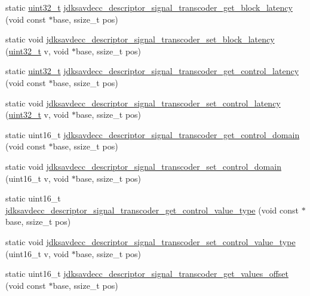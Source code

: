\begin{DoxyCompactItemize}
static \hyperlink{parse_8c_a6eb1e68cc391dd753bc8ce896dbb8315}{uint32\+\_\+t} \hyperlink{group__descriptor__transcoder_ga747b2b28da46e2c0f3bf92f45ff433cf}{jdksavdecc\+\_\+descriptor\+\_\+signal\+\_\+transcoder\+\_\+get\+\_\+block\+\_\+latency} (void const $\ast$base, ssize\+\_\+t pos)
\item 
static void \hyperlink{group__descriptor__transcoder_ga74c6c70c19aec0d001be07c4ea5e559f}{jdksavdecc\+\_\+descriptor\+\_\+signal\+\_\+transcoder\+\_\+set\+\_\+block\+\_\+latency} (\hyperlink{parse_8c_a6eb1e68cc391dd753bc8ce896dbb8315}{uint32\+\_\+t} v, void $\ast$base, ssize\+\_\+t pos)
\item 
static \hyperlink{parse_8c_a6eb1e68cc391dd753bc8ce896dbb8315}{uint32\+\_\+t} \hyperlink{group__descriptor__transcoder_gafbe51054f4b853727f902d0eb37499cf}{jdksavdecc\+\_\+descriptor\+\_\+signal\+\_\+transcoder\+\_\+get\+\_\+control\+\_\+latency} (void const $\ast$base, ssize\+\_\+t pos)
\item 
static void \hyperlink{group__descriptor__transcoder_gad57618363cabb19525d09165a26752bd}{jdksavdecc\+\_\+descriptor\+\_\+signal\+\_\+transcoder\+\_\+set\+\_\+control\+\_\+latency} (\hyperlink{parse_8c_a6eb1e68cc391dd753bc8ce896dbb8315}{uint32\+\_\+t} v, void $\ast$base, ssize\+\_\+t pos)
\item 
static uint16\+\_\+t \hyperlink{group__descriptor__transcoder_ga888814a14a73fbfafd1f19c3458607ea}{jdksavdecc\+\_\+descriptor\+\_\+signal\+\_\+transcoder\+\_\+get\+\_\+control\+\_\+domain} (void const $\ast$base, ssize\+\_\+t pos)
\item 
static void \hyperlink{group__descriptor__transcoder_gac6a523bb0bec32d4938b03ca997a22f5}{jdksavdecc\+\_\+descriptor\+\_\+signal\+\_\+transcoder\+\_\+set\+\_\+control\+\_\+domain} (uint16\+\_\+t v, void $\ast$base, ssize\+\_\+t pos)
\item 
static uint16\+\_\+t \hyperlink{group__descriptor__transcoder_ga0d02cb0435a77412f0d67f45ae21a534}{jdksavdecc\+\_\+descriptor\+\_\+signal\+\_\+transcoder\+\_\+get\+\_\+control\+\_\+value\+\_\+type} (void const $\ast$base, ssize\+\_\+t pos)
\item 
static void \hyperlink{group__descriptor__transcoder_gaa1f95177969d3783a181bd98ba0fa8cb}{jdksavdecc\+\_\+descriptor\+\_\+signal\+\_\+transcoder\+\_\+set\+\_\+control\+\_\+value\+\_\+type} (uint16\+\_\+t v, void $\ast$base, ssize\+\_\+t pos)
\item 
static uint16\+\_\+t \hyperlink{group__descriptor__transcoder_gae992b3b6e7368beec8dd0e23aff64d1f}{jdksavdecc\+\_\+descriptor\+\_\+signal\+\_\+transcoder\+\_\+get\+\_\+values\+\_\+offset} (void const $\ast$base, ssize\+\_\+t pos)

\end{DoxyCompactItemize}
